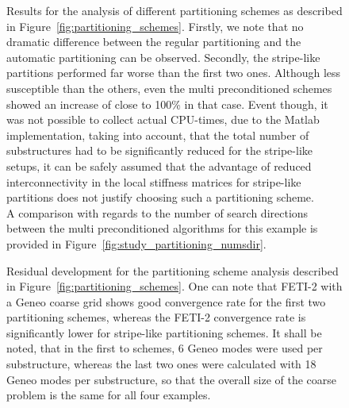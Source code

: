 \begin{figure}[tb]
  \begin{center}
    
    \caption[Study of partitioning schemes: \# iterations]{Results for the analysis of different partitioning schemes as described in Figure~\ref{fig:partitioning_schemes}. Firstly, we note that no dramatic difference between the regular partitioning and the automatic partitioning can be observed. Secondly, the stripe-like partitions performed far worse than the first two ones. Although less susceptible than the others, even the multi preconditioned schemes showed an increase of close to 100\% in that case. Event though, it was not possible to collect actual CPU-times, due to the Matlab implementation, taking into account, that the total number of substructures had to be significantly reduced for the stripe-like setups, it can be safely assumed that the advantage of reduced interconnectivity in the local stiffness matrices for stripe-like partitions does not justify choosing such a partitioning scheme.\\
      A comparison with regards to the number of search directions between the multi preconditioned algorithms for this example is provided in Figure~\ref{fig:study_partitioning_numsdir}. }
    \label{fig:study_partitioning_numiter}
  \end{center}
\end{figure}


\begin{figure}
  \begin{center}
    
    \caption[Study of partitioning schemes: residua]{Residual development for the partitioning scheme analysis described in Figure~\ref{fig:partitioning_schemes}. One can note that FETI-2 with a Geneo coarse grid shows good convergence rate for the first two partitioning schemes, whereas the FETI-2 convergence rate is significantly lower for stripe-like partitioning schemes. It shall be noted, that in the first to schemes, 6 Geneo modes were used per substructure, whereas the last two ones were calculated with 18 Geneo modes per substructure, so that the overall size of the coarse problem is the same for all four examples.}
    \label{fig:study_partitioning_residual}
  \end{center}
\end{figure}


